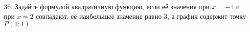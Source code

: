 36. Задайте формулой квадратичную функцию, если её значения при $x=-1$ и при $x=2$ совпадают, её наибольшее значение равно 3, а график содержит точку $P(1;1).$\\
